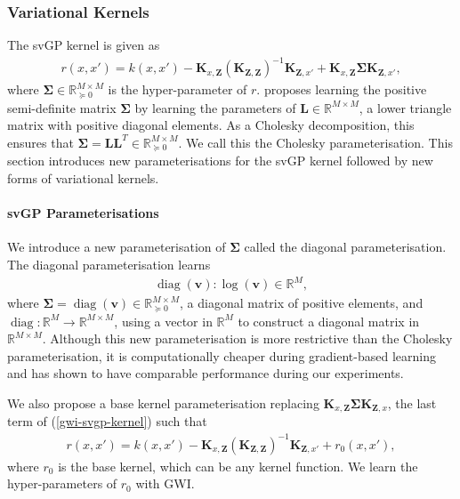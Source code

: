 \documentclass{article}
\newcommand{\diag}{\operatorname{diag}}
\numberwithin{equation}{section}
\begin{document}
\subsubsection{Variational Kernels}\label{variational-kernels}
The svGP kernel is given as
\begin{align}
    r(x, x') = k(x, x') - \mathbf{K}_{x, \mathbf{Z}} \left(\mathbf{K}_{\mathbf{Z}, \mathbf{Z}}\right)^{-1} \mathbf{K}_{\mathbf{Z}, x'} + \mathbf{K}_{x, \mathbf{Z}} \mathbf{\Sigma} \mathbf{K}_{\mathbf{Z}, x'},
    \label{gwi-svgp-kernel}
\end{align}
where $\mathbf{\Sigma} \in \mathbb{R}^{M \times M}_{\succcurlyeq 0}$ is the hyper-parameter of $r$. 
\cite{wild2022generalized} proposes learning the positive semi-definite matrix $\mathbf{\Sigma}$ by learning the parameters of $\mathbf{L} \in \mathbb{R}^{M \times M}$, a lower triangle matrix with positive diagonal elements.
As a Cholesky decomposition, this ensures that $\mathbf{\Sigma} = \mathbf{L}\mathbf{L}^T \in \mathbb{R}^{M \times M}_{\succcurlyeq 0}$. 
We call this the Cholesky parameterisation. 
This section introduces new parameterisations for the svGP kernel followed by new forms of variational kernels.

\paragraph{svGP Parameterisations}
We introduce a new parameterisation of $\mathbf{\Sigma}$ called the diagonal parameterisation. The diagonal parameterisation learns
\begin{align}
    \diag(\mathbf{v}): \log(\mathbf{v}) \in \mathbb{R}^M,
\end{align}
where $\mathbf{\Sigma} = \diag(\mathbf{v}) \in \mathbb{R}^{M \times M}_{\succcurlyeq 0}$, a diagonal matrix of positive elements, and $\diag: \mathbb{R}^M \rightarrow \mathbb{R}^{M \times M}$, using a vector in $\mathbb{R}^M$ to construct a diagonal matrix in $\mathbb{R}^{M \times M}$.
Although this new parameterisation is more restrictive than the Cholesky parameterisation, it is computationally cheaper during gradient-based learning and has shown to have comparable performance during our experiments.

We also propose a base kernel parameterisation replacing $\mathbf{K}_{x, \mathbf{Z}} \mathbf{\Sigma} \mathbf{K}_{\mathbf{Z}, x}$, the last term of (\ref{gwi-svgp-kernel}) such that
\begin{align}
    r(x, x') = k(x, x') - \mathbf{K}_{x, \mathbf{Z}} \left( \mathbf{K}_{\mathbf{Z}, \mathbf{Z}}\right)^{-1} \mathbf{K}_{\mathbf{Z}, x'} + r_0(x, x'),
\end{align}
where $r_0$ is the base kernel, which can be any kernel function. We learn the hyper-parameters of $r_0$ with GWI.
\end{document}
